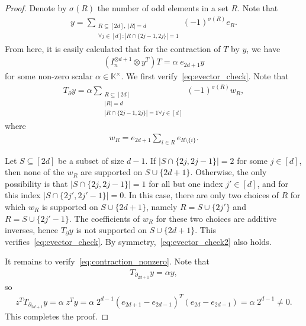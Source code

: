 \documentclass[10pt,a4paper]{amsart}
\newcommand{\K}{\mathbb K}
\begin{document}
\begin{proof}
	Denote by $ \sigma(R) $ the number of odd elements in a set $ R $. Note that
	\begin{align*}
		y=\sum_{\substack{R \subseteq [2d],\: |R|=d\\ \forall  j\in [d]\colon |R \cap \{2j-1,2j\}|=1}} (-1)^{\sigma(R)} e_R.
	\end{align*}
	From here, it is easily calculated that for the contraction of $ T $ by $ y $, we have
	\begin{align*}
		(I_n^{\otimes d+1} \otimes y^{T})T= \alpha \; e_{2d+1} y
	\end{align*}
	for some non-zero scalar $\alpha \in \K^{\times}$. We first verify~\eqref{eq:evector_check}. Note that
	\begin{align*}
		T_{\partial} y = \alpha \sum_{\substack{R \subseteq [2d]\\ |R|=d\\ |R \cap \{2j-1,2j\}|=1 \forall  j\in [d]}} (-1)^{\sigma(R)} w_R,
	\end{align*}
	where
	\begin{align*}
		w_R=e_{2d+1}\sum_{i \in R} e_{R \setminus \{i\}}.
	\end{align*}
	
	Let $S \subseteq [2d]$ be a subset of size $d-1$. If $|S \cap \{2j,2j-1\}|=2$ for some $j \in [d]$, then none of the $w_R$ are supported on $S \cup \{2d+1\}$. Otherwise, the only possibility is that $|S \cap \{2j,2j-1\}|=1$ for all but one index $j' \in [d]$, and for this index $|S \cap \{2j',2j'-1\}|=0$. In this case, there are only two choices of $R$ for which $w_{R}$ is supported on $S \cup \{2d+1\}$, namely $R=S \cup \{2j'\}$ and $R=S \cup \{2j'-1\}$. The coefficients of $w_R$ for these two choices are additive inverses, hence $T_{\partial} y$ is not supported on $S \cup \{2d+1\}$. This verifies~\eqref{eq:evector_check}. By symmetry,~\eqref{eq:evector_check2} also holds.
	
	It remains to verify~\eqref{eq:contraction_nonzero}. Note that
	\begin{align*}
	T_{\partial_{2d+1}} y = \alpha y,
	\end{align*}
	so
	\begin{align*}
	z^T T_{\partial_{2d+1}} y=\alpha \; z^T y= \alpha \; 2^{d-1} (e_{2d+1}-e_{2d-1})^T (e_{2d}-e_{2d-1})= \alpha \; 2^{d-1} \neq 0.
	\end{align*}
	This completes the proof.
\end{proof}
\end{document}
